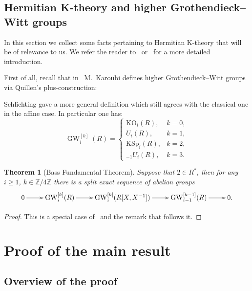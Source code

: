\documentclass[oneside, 10pt]{amsart}
\newtheorem{theorem}{Theorem}
\theoremstyle{remark}
\theoremstyle{definition}
\DeclareMathOperator{\GW}{GW}
\newcommand{\ZZ}{\mathbb{Z}}
\numberwithin{equation}{section}
\begin{document}
\subsection{Hermitian K-theory and higher Grothendieck--Witt groups}
In this section we collect some facts pertaining to Hermitian K-theory that will be of relevance to us. We refer the reader to~\cite[\S~2]{AF17} or~\cite[\S~2]{FRS12} for a more detailed introduction.

First of all, recall that in~\cite{Ka80} M.~Karoubi defines higher Grothendieck--Witt groups via Quillen's plus-construction:

Schlichting gave a more general definition which still agrees with the classical one in the affine case.
In particular one has:
\begin{equation}
 \GW_i^{[k]}(R) = \left\{\begin{array}{ll} \mathrm{KO}_i(R), & k = 0, \\ U_i(R), & k = 1, \\ \mathrm{KSp}_i(R), & k = 2, \\ {}_{-1}\!U_i(R), & k = 3. \end{array}\right.
\end{equation}


\begin{theorem}[Bass Fundamental Theorem]\label{bass-ft} Suppose that $2 \in R^*$, then for any $i\geq 1$, $k\in \ZZ/4\ZZ$ there is a split exact sequence of abelian groups
 \[ \xymatrix{ 0 \ar[r] & \GW_i^{[k]}(R) \ar[r] &  \GW_i^{[k]}(R[X, X^{-1}]) \ar[r]  & \GW_{i-1}^{[k-1]}(R) \ar[r] & 0.} \] \end{theorem}
\begin{proof} This is a special case of~\cite[Theorem~9.13]{Sch16} and the remark that follows it. \end{proof}

\section{Proof of the main result}
\subsection{Overview of the proof}
\end{document}
